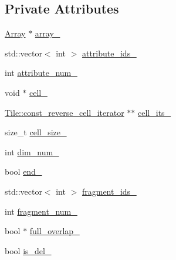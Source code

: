 \subsection*{Private Attributes}
\begin{DoxyCompactItemize}
\item 
\hyperlink{classStorageManager_1_1Array}{Array} $\ast$ \hyperlink{classStorageManager_1_1Array_1_1const__reverse__cell__iterator_ae9015a8497d6f8da85e1179812cc8585}{array\+\_\+}
\item 
std\+::vector$<$ int $>$ \hyperlink{classStorageManager_1_1Array_1_1const__reverse__cell__iterator_ab52d06b20baffddb47cf89c80e17c7de}{attribute\+\_\+ids\+\_\+}
\item 
int \hyperlink{classStorageManager_1_1Array_1_1const__reverse__cell__iterator_ae2ae35803cb3730571ee9f86f09fe941}{attribute\+\_\+num\+\_\+}
\item 
void $\ast$ \hyperlink{classStorageManager_1_1Array_1_1const__reverse__cell__iterator_a80af6f1e1e74dd28172ba6f5500289fb}{cell\+\_\+}
\item 
\hyperlink{classTile_1_1const__reverse__cell__iterator}{Tile\+::const\+\_\+reverse\+\_\+cell\+\_\+iterator} $\ast$$\ast$ \hyperlink{classStorageManager_1_1Array_1_1const__reverse__cell__iterator_ad4f58978cc17b0bcf4d498915a5cca1b}{cell\+\_\+its\+\_\+}
\item 
size\+\_\+t \hyperlink{classStorageManager_1_1Array_1_1const__reverse__cell__iterator_af073bd6ff65c84ead2a53b23cf6ddf65}{cell\+\_\+size\+\_\+}
\item 
int \hyperlink{classStorageManager_1_1Array_1_1const__reverse__cell__iterator_a0b9070d214b7a1b7d5b419dbd2d0bfb6}{dim\+\_\+num\+\_\+}
\item 
bool \hyperlink{classStorageManager_1_1Array_1_1const__reverse__cell__iterator_a053deba563ae436f07b1c7c111aff8ab}{end\+\_\+}
\item 
std\+::vector$<$ int $>$ \hyperlink{classStorageManager_1_1Array_1_1const__reverse__cell__iterator_a7ea5fedc37a655e9dd65e471171c0266}{fragment\+\_\+ids\+\_\+}
\item 
int \hyperlink{classStorageManager_1_1Array_1_1const__reverse__cell__iterator_a1261d5ce3cade89ea94751531325dff4}{fragment\+\_\+num\+\_\+}
\item 
bool $\ast$ \hyperlink{classStorageManager_1_1Array_1_1const__reverse__cell__iterator_aad2b6034087c122241059f16bf6131b1}{full\+\_\+overlap\+\_\+}
\item 
bool \hyperlink{classStorageManager_1_1Array_1_1const__reverse__cell__iterator_ae3e2b057d538114638ac0ac0476a8ba8}{is\+\_\+del\+\_\+}
$$
\end{DoxyCompactItemize}
